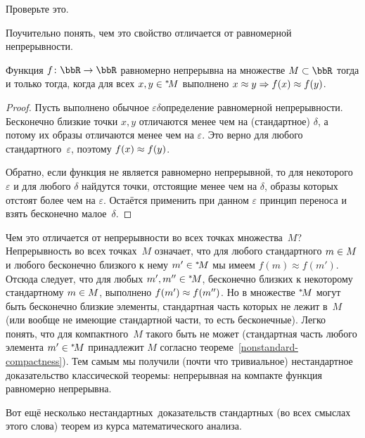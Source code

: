 \begin{problem}
Проверьте это.
\end{problem}

Поучительно понять, чем это свойство отличается от равномерной
непрерывности.

\begin{theorem}
Функция $f\colon\bbR\to\bbR$ равномерно непрерывна%
%
на множестве
$M\subset\bbR$ тогда и только тогда, когда для всех $x,y\hm\in
\nst M$ выполнено ${x\approx y}\hm\Rightarrow {f(x)\approx
f(y)}$.
\end{theorem}

\begin{proof}
Пусть выполнено обычное $\varepsilon$\д $\delta$\д определение
равномерной непрерывности. Бесконечно близкие точки $x,y$ отличаются
менее чем на (стандартное) $\delta$, а потому их образы
отличаются менее чем на $\varepsilon$. Это верно для любого
стандартного~$\varepsilon$, поэтому $f(x)\hm\approx f(y)$.

Обратно, если функция не является равномерно непрерывной, то для
некоторого $\varepsilon$ и для любого $\delta$ найдутся точки,
отстоящие менее чем на $\delta$, образы которых отстоят более
чем на $\varepsilon$. Остаётся применить при данном
$\varepsilon$ принцип переноса и взять бесконечно
малое~$\delta$.
\end{proof}

Чем это отличается от непрерывности во всех точках
множества~$M$? Непрерывность во всех точках~$M$ означает, что
для любого стандартного $m\hm\in M$ и любого бесконечно близкого
к нему $m'\hm\in \nst{M}$ мы имеем $f(m)\approx f(m')$.
Отсюда следует, что для любых $m',m''\hm\in\nst{M}$, бесконечно
близких к некоторому стандартному $m\hm\in M$, выполнено
$f(m')\hm\approx f(m'')$. Но в множестве ${}^*\!M$ могут быть
бесконечно близкие элементы, стандартная часть которых не лежит
в~$M$ (или вообще не имеющие стандартной части, то есть
бесконечные). Легко понять, что для компактного~$M$ такого быть
не может (стандартная часть любого элемента $m'\hm\in\nst{M}$
принадлежит $M$ согласно теореме~\ref{nonstandard-compactness}).
Тем самым мы получили (почти что тривиальное) нестандартное
доказательство классической теоремы: непрерывная на компакте
функция равномерно непрерывна.

Вот ещё несколько  нестандартных\ доказательств
стандартных (во всех смыслах этого слова) теорем из курса
математического анализа.

